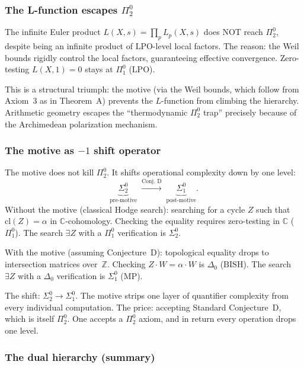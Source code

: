 \documentclass[11pt]{article}
\theoremstyle{definition}
\theoremstyle{remark}
\newcommand{\Z}{\mathbb{Z}}
\newcommand{\C}{\mathbb{C}}
\newcommand{\LPO}{\mathrm{LPO}}
\newcommand{\MP}{\mathrm{MP}}
\newcommand{\BISH}{\mathrm{BISH}}
\begin{document}
\subsubsection{The L-function escapes $\Pi_2^0$}

The infinite Euler product $L(X,s) = \prod_p L_p(X,s)$ does NOT reach $\Pi_2^0$, despite being an infinite product of $\LPO$-level local factors. The reason: the Weil bounds rigidly control the local factors, guaranteeing effective convergence. Zero-testing $L(X,1) = 0$ stays at $\Pi_1^0$ ($\LPO$).

This is a structural triumph: the motive (via the Weil bounds, which follow from Axiom~3 as in Theorem~A) prevents the $L$-function from climbing the hierarchy. Arithmetic geometry escapes the ``thermodynamic $\Pi_2^0$ trap'' precisely because of the Archimedean polarization mechanism.

\subsubsection{The motive as $-1$ shift operator}

The motive does not kill $\Pi_2^0$. It shifts operational complexity down by one level:
\[
\underbrace{\Sigma_2^0}_{\text{pre-motive}} \;\xrightarrow{\text{Conj.\ D}}\; \underbrace{\Sigma_1^0}_{\text{post-motive}}.
\]
Without the motive (classical Hodge search): searching for a cycle $Z$ such that $\mathrm{cl}(Z) = \alpha$ in $\C$-cohomology. Checking the equality requires zero-testing in $\C$ ($\Pi_1^0$). The search $\exists Z$ with a $\Pi_1^0$ verification is $\Sigma_2^0$.

With the motive (assuming Conjecture~D): topological equality drops to intersection matrices over~$\Z$. Checking $Z \cdot W = \alpha \cdot W$ is $\Delta_0$ ($\BISH$). The search $\exists Z$ with a $\Delta_0$ verification is $\Sigma_1^0$ ($\MP$).

The shift: $\Sigma_2^0 \to \Sigma_1^0$. The motive strips one layer of quantifier complexity from every individual computation. The price: accepting Standard Conjecture~D, which is itself $\Pi_2^0$. One accepts a $\Pi_2^0$ axiom, and in return every operation drops one level.

\subsubsection{The dual hierarchy (summary)}
\end{document}

